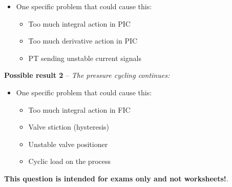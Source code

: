 \begin{itemize}
\item{} One specific problem that could cause this: 
\begin{itemize}

\item{} Too much integral action in PIC
\item{} Too much derivative action in PIC
\item{} PT sending unstable current signals
\end{itemize}
\end{itemize}

\noindent
{\bf Possible result 2} -- {\it The pressure cycling continues:}

\begin{itemize}
\item{} One specific problem that could cause this:
\begin{itemize}

\item{} Too much integral action in FIC
\item{} Valve stiction (hysteresis)
\item{} Unstable valve positioner
\item{} Cyclic load on the process
\end{itemize}
\end{itemize}









{\bf This question is intended for exams only and not worksheets!}.



